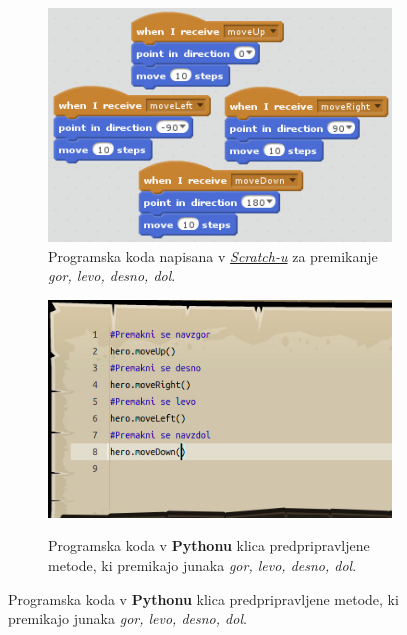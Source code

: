  \begin{figure}[h!]
    \centering
    \begin{subfigure}[]{0.35\textwidth}
      \includegraphics[width=\textwidth]{./images/sc_web/primerjava_scr-premiki-v01.jpg}
      \caption{Programska koda napisana v
        \emph{\href{https://scratch.mit.edu/}{Scratch-u}}
        \cite{web:scratch} za premikanje \emph{gor, levo, desno, dol}.}
        \label{fig:primerjava:scr01}
      \end{subfigure}
      \qquad
    \begin{subfigure}[]{0.35\textwidth}
        \includegraphics[width=\textwidth]{./images/sc_web/primerjava_cc-premiki-v01.jpg}
        \caption{Programska koda v \textbf{Pythonu} klica
          predpripravljene metode, ki premikajo junaka \emph{gor,
            levo, desno, dol}.}
          \cite{web:codecombat}
        \label{fig:primerjava:cc01}
    \end{subfigure}

\end{figure}
